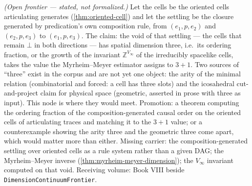 \begin{theorem}\label{thm:void-dimension}\notready{}
\emph{(Open frontier --- stated, not formalized.)} Let the cells be the oriented
cells articulating generates (\cref{thm:oriented-cell}) and let the settling be the
closure generated by predication's own composition rule, from $(e_1,p,e_2)$ and
$(e_2,p,e_3)$ to $(e_1,p,e_3)$. The claim: the void of that settling --- the cells
that remain $\bot$ in both directions --- has spatial dimension three, i.e.\ its
ordering fraction, or the growth of the invariant $\mathbb Z^{V_\infty}$ of the
irreducibly spacelike cells, takes the value the Myrheim--Meyer estimator assigns to
$3{+}1$. Two sources of ``three'' exist in the corpus and are not yet one object:
the arity of the minimal relation (combinatorial and forced: a cell has three
slots) and the icosahedral cut-and-project claim for physical space (geometric,
asserted in prose with three as input). This node is where they would meet.
Promotion: a theorem computing the ordering fraction of the composition-generated
causal order on the oriented cells of articulating traces and matching it to the
$3{+}1$ value; or a counterexample showing the arity three and the geometric
three come apart, which would matter more than either. Missing carrier: the
composition-generated settling over oriented cells as a rule system rather than
a given DAG; the Myrheim--Meyer inverse (\cref{thm:myrheim-meyer-dimension}); the
$V_\infty$ invariant computed on that void. Receiving volume: Book VIII beside
\texttt{DimensionContinuumFrontier}.
\end{theorem}
